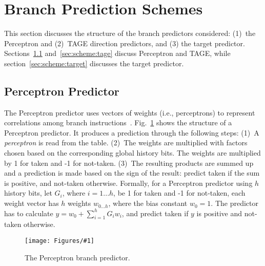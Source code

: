 \documentclass[conference]{IEEEtran}
\newcommand{\kfig}[4]{ %
        \begin{figure}[!t]
        \centering
        \texttt{[image: Figures/\#1]}
        \vspace{-1mm}
        \caption{#3}
        \vspace{-6mm}
        \label{#2}
        \end{figure}
}
\begin{document}
\section{Branch Prediction Schemes}
\label{sec:scheme}
This section discusses the structure of the branch predictors considered: (1)\ the Perceptron and (2)\ TAGE direction predictors, and (3) the target predictor. Sections~\ref{sec:scheme:perceptron} and~\ref{sec:scheme:tage} discuss Perceptron and TAGE, while section~\ref{sec:scheme:target} discusses the target predictor. \vspace{-3mm}

\subsection{Perceptron Predictor}
\label{sec:scheme:perceptron}
The Perceptron predictor uses vectors of weights (i.e., perceptrons) to represent correlations among branch instructions~\cite{perceptron}. Fig.~\ref{fig:perceptron} shows the structure of a Perceptron predictor. It produces a prediction through the following steps: (1)~A \textit{perceptron} is read from the table. (2)~The weights are multiplied with factors chosen based on the corresponding global history bits. The weights are multiplied by 1 for taken and -1 for not-taken. (3)~The resulting products are summed up and a prediction is made based on the sign of the result: predict taken if the sum is positive, and not-taken otherwise. Formally, for a Perceptron predictor using $h$ history bits, let $G_i$, where $i = 1...h$, be 1 for taken and -1 for not-taken, each weight vector has $h$ weights $w_{0...h}$, where the bias constant $w_0 = 1$. The predictor has to calculate $y = w_0 + \sum_{i=1}^{h} G_iw_i$, and predict taken if $y$ is positive and not-taken otherwise. \vspace{-3mm}

\kfig{perceptron.pdf}{fig:perceptron}{The Perceptron branch predictor.}{angle = 0, trim = 1in 3.5in 2in 1.1in, clip, width=0.4\textwidth}
\end{document}
